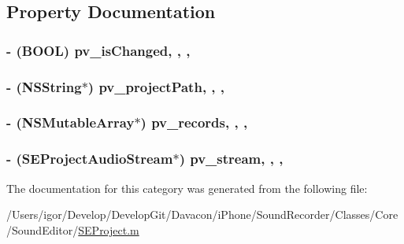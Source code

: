 \subsection{Property Documentation}
\hypertarget{category_s_e_project_07_08_ac3ea8d84f56007c0b810c3d9bdf14192}{
\subsubsection[{pv\-\_\-is\-Changed}]{\setlength{\rightskip}{0pt plus 5cm}-\/ (B\-O\-O\-L) pv\-\_\-is\-Changed\hspace{0.3cm}{\ttfamily [read]}, {\ttfamily [write]}, {\ttfamily [nonatomic]}, {\ttfamily [assign]}}}\label{category_s_e_project_07_08_ac3ea8d84f56007c0b810c3d9bdf14192}
\hypertarget{category_s_e_project_07_08_a1ce0384975a5debe55f63d9d89116469}{
\subsubsection[{pv\-\_\-project\-Path}]{\setlength{\rightskip}{0pt plus 5cm}-\/ (N\-S\-String$\ast$) pv\-\_\-project\-Path\hspace{0.3cm}{\ttfamily [read]}, {\ttfamily [write]}, {\ttfamily [nonatomic]}, {\ttfamily [strong]}}}\label{category_s_e_project_07_08_a1ce0384975a5debe55f63d9d89116469}
\hypertarget{category_s_e_project_07_08_ae2c8be64c26691c643438545604ef2e2}{
\subsubsection[{pv\-\_\-records}]{\setlength{\rightskip}{0pt plus 5cm}-\/ (N\-S\-Mutable\-Array$\ast$) pv\-\_\-records\hspace{0.3cm}{\ttfamily [read]}, {\ttfamily [write]}, {\ttfamily [nonatomic]}, {\ttfamily [strong]}}}\label{category_s_e_project_07_08_ae2c8be64c26691c643438545604ef2e2}
\hypertarget{category_s_e_project_07_08_ac797d5923f8b64961cdaea1f08f8e35e}{
\subsubsection[{pv\-\_\-stream}]{\setlength{\rightskip}{0pt plus 5cm}-\/ (S\-E\-Project\-Audio\-Stream$\ast$) pv\-\_\-stream\hspace{0.3cm}{\ttfamily [read]}, {\ttfamily [write]}, {\ttfamily [nonatomic]}, {\ttfamily [strong]}}}\label{category_s_e_project_07_08_ac797d5923f8b64961cdaea1f08f8e35e}


The documentation for this category was generated from the following file\-:\begin{DoxyCompactItemize}
\item 
/\-Users/igor/\-Develop/\-Develop\-Git/\-Davacon/i\-Phone/\-Sound\-Recorder/\-Classes/\-Core/\-Sound\-Editor/\hyperlink{_s_e_project_8m}{S\-E\-Project.\-m}\end{DoxyCompactItemize}
